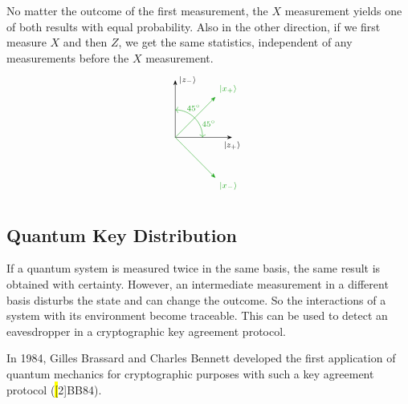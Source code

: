 No matter the outcome of the first measurement, the $X$ measurement yields one of both results with equal probability.
Also in the other direction, if we first measure $X$ and then $Z$, we get the same statistics, independent of any measurements before the $X$ measurement.
\[
\begin{tikzpicture}[scale=1.8, font=\scriptsize]
  \definecolor{statecolor}{HTML}{\eat #20a61e}
  \draw[-Stealth, black] (0,0) -- (0,1) node[right] {$\ket{z_{-}}$};
  \draw[-Stealth, black] (0,0) -- (1,0) node[below] {$\ket{z_{+}}$};
  \draw[-Stealth, statecolor] (0,0) -- ({cos(45)},{sin(45)}) node[above right] {$\ket{x_{+}}$};
  \draw[-Stealth, statecolor] (0,0) -- ({cos(45)},-{sin(45)}) node[below right] {$\ket{x_{-}}$};
  \draw[statecolor,<->] (0.48,0) arc (0:90:0.48) node [above right, inner sep = 0pt, outer sep =1pt, pos=0.23] {$45^\circ$} node [above right, inner sep = 0pt, outer sep =1pt, pos=0.75] {$45^\circ$};
\end{tikzpicture}
\]




\subsection{Quantum Key Distribution}\label{sec:quantum-key-distribution}

If a quantum system is measured twice in the same basis, the same result is obtained with certainty. 
However, an intermediate measurement in a different basis disturbs the state and can change the outcome.
So the interactions of a system with its environment become traceable. 
This can be used to detect an eavesdropper in a cryptographic key agreement protocol.

In 1984, Gilles Brassard and Charles Bennett developed the first application of quantum mechanics for cryptographic purposes with such a key agreement protocol (\hl[2]{BB84}).

